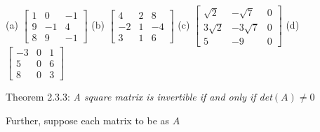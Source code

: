 \documentclass[addpoints]{exam}
\begin{document}
\begin{sloppypar}
\begin{questions}
        (a) $ \begin{bmatrix}
            1 & 0 & -1 \\ 9 & -1 & 4 \\ 8 & 9 & -1
        \end{bmatrix} $
        \hspace*{5mm} (b) $ \begin{bmatrix}
            4 & 2 & 8 \\ -2 & 1 & -4 \\ 3 & 1 & 6
        \end{bmatrix} $
        \hspace*{5mm} (c) $ \begin{bmatrix}
            \sqrt{2} & -\sqrt{7} & 0 \\ 3\sqrt{2} & -3\sqrt{7} & 0 \\ 5 & -9 & 0 
        \end{bmatrix} $
        \hspace*{5mm} (d) $ \begin{bmatrix}
            -3 & 0 & 1 \\ 5 & 0 & 6 \\ 8 & 0 & 3
        \end{bmatrix} $
        \begin{solution}

            Theorem 2.3.3: \textit{A square matrix is invertible if and only if det$ (A) \neq 0 $}

            Further, suppose each matrix to be as $A$
\end{solution}
\end{questions}
\end{sloppypar}
\end{document}
